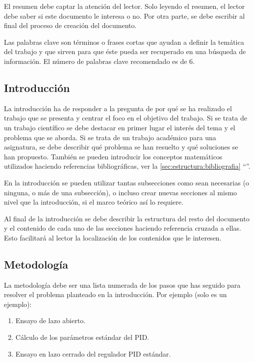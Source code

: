 \documentclass[11pt]{article}
\begin{document}
El resumen debe captar la atención del lector. Solo leyendo el resumen, el lector debe saber si este documento le interesa o no. Por otra parte, se debe escribir al final del proceso de creación del documento.

Las palabras clave son términos o frases cortas que ayudan a definir la temática del trabajo y que sirven para que éste pueda ser recuperado en una búsqueda de información. El número de palabras clave recomendado es de 6.

\subsection{Introducción}

La introducción ha de responder a la pregunta de por qué se ha realizado el trabajo que se presenta y centrar el foco en el objetivo del trabajo. Si se trata de un trabajo científico se debe destacar en primer lugar el interés del tema y el problema que se aborda. Si se trata de un trabajo académico para una asignatura, se debe describir qué problema se han resuelto y qué soluciones se han propuesto. También se pueden introducir los conceptos matemáticos utilizados haciendo referencias bibliográficas, ver la \autoref{sec:estructura:bibliografia} ``''. 

En la introducción se pueden utilizar tantas subsecciones como sean necesarias (o ninguna, o más de una subsección), o incluso crear nuevas secciones al mismo nivel que la introducción, si el marco teórico así lo requiere.

Al final de la introducción se debe describir la estructura del resto del documento y el contenido de cada uno de las secciones haciendo referencia cruzada a ellas. Esto facilitará al lector la localización de los contenidos que le interesen.

\subsection{Metodología}

La metodología debe ser una lista numerada de los pasos que has seguido para resolver el problema planteado en la introducción. Por ejemplo (solo es un ejemplo):

\begin{enumerate}
    \item Ensayo de lazo abierto.
    \item Cálculo de los parámetros estándar del PID.
    \item Ensayo en lazo cerrado del regulador PID estándar.
\end{enumerate}
\end{document}
